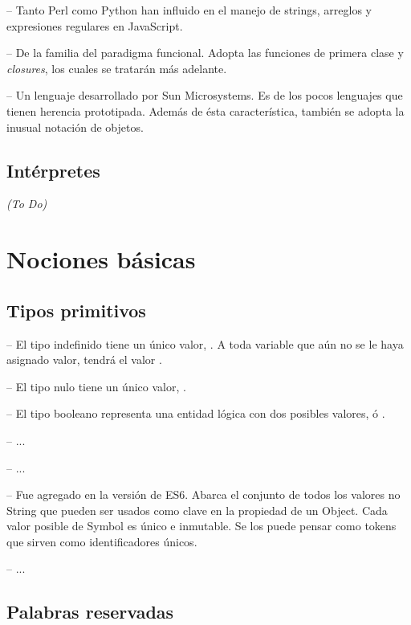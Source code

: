  -- Tanto Perl como Python han influido en el manejo de strings, arreglos y expresiones regulares en JavaScript.

 -- De la familia del paradigma funcional. Adopta las funciones de primera clase y \textit{closures}, los cuales se tratarán más adelante.

 -- Un lenguaje desarrollado por Sun Microsystems. Es de los pocos lenguajes que tienen herencia prototipada. Además de ésta característica, también se adopta la inusual notación de objetos.

\subsection{Intérpretes}

\textit{(To Do)}



\section{Nociones básicas}

\subsection{Tipos primitivos}

 -- El tipo indefinido tiene un único valor, . A toda variable que aún no se le haya asignado valor, tendrá el valor .

 -- El tipo nulo tiene un único valor, .

 -- El tipo booleano representa una entidad lógica con dos posibles valores,  ó .

 -- ...

 -- ...

 -- Fue agregado en la versión de ES6. Abarca el conjunto de todos los valores no String que pueden ser usados como clave en la propiedad de un Object. Cada valor posible de Symbol es único e inmutable. Se los puede pensar como tokens que sirven como identificadores únicos. 

 -- ...


\subsection{Palabras reservadas}

